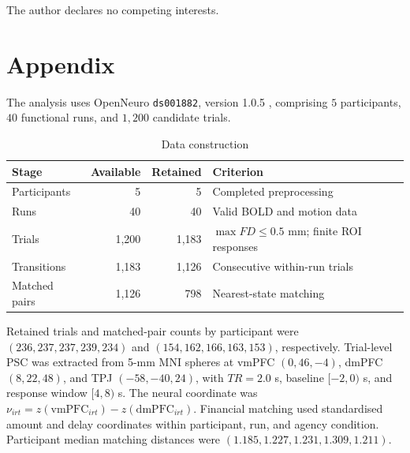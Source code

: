 \documentclass[graybox,natbib]{SNmult}
\providecommand{\1}{}
\renewcommand{\1}{\mathbbm 1}
\begin{document}
The author declares no competing interests.





\appendix
\section{Appendix}
\label{app:appendix}

The analysis uses OpenNeuro \texttt{ds001882}, version 1.0.5
\citep{PivaEtAl2019Dataset}, comprising \(5\) participants,
\(40\) functional runs, and \(1{,}200\) candidate trials.

\begin{table}[htbp]
\centering
\caption{Data construction}
\label{tab:data-lineage}
\small
\begin{tabular}{lrrl}
\toprule
Stage & Available & Retained & Criterion \\
\midrule
Participants  & 5     & 5     & Completed preprocessing \\
Runs          & 40    & 40    & Valid BOLD and motion data \\
Trials        & 1,200 & 1,183 & \(\max FD\leq0.5\) mm; finite ROI responses \\
Transitions   & 1,183 & 1,126 & Consecutive within-run trials \\
Matched pairs & 1,126 & 798   & Nearest-state matching \\
\bottomrule
\end{tabular}
\end{table}

Retained trials and matched-pair counts by participant were
\((236,237,237,239,234)\) and \((154,162,166,163,153)\), respectively. Trial-level PSC was extracted from 5-mm MNI spheres at vmPFC \((0,46,-4)\),
dmPFC \((8,22,48)\), and TPJ \((-58,-40,24)\), with \(TR=2.0\) s, baseline
\([-2,0)\) s, and response window \([4,8)\) s. The neural coordinate was
\(\nu_{irt}=z(\mathrm{vmPFC}_{irt})-z(\mathrm{dmPFC}_{irt})\). Financial matching used standardised amount and delay coordinates within
participant, run, and agency condition. Participant median matching distances
were \((1.185,1.227,1.231,1.309,1.211)\).
\end{document}
